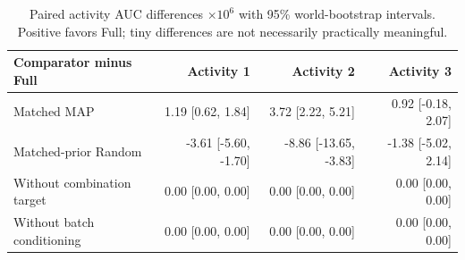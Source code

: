 \begin{table}[H]
\centering
\caption{Paired activity AUC differences $\times10^6$ with 95\% world-bootstrap intervals. Positive favors Full; tiny differences are not necessarily practically meaningful.}
\label{tab:paired}
\scriptsize
\setlength{\tabcolsep}{3pt}
\begin{tabular}{lrrr}
\toprule
Comparator minus Full & Activity 1 & Activity 2 & Activity 3 \\
\midrule
Matched MAP & 1.19 [0.62, 1.84] & 3.72 [2.22, 5.21] & 0.92 [-0.18, 2.07] \\
Matched-prior Random & -3.61 [-5.60, -1.70] & -8.86 [-13.65, -3.83] & -1.38 [-5.02, 2.14] \\
Without combination target & 0.00 [0.00, 0.00] & 0.00 [0.00, 0.00] & 0.00 [0.00, 0.00] \\
Without batch conditioning & 0.00 [0.00, 0.00] & 0.00 [0.00, 0.00] & 0.00 [0.00, 0.00] \\
\bottomrule
\end{tabular}
\end{table}
